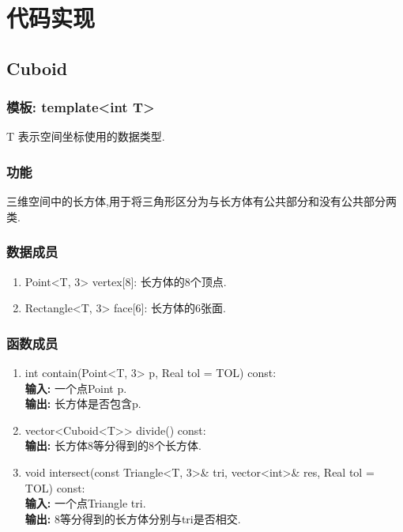 \documentclass[a4paper]{book}
\numberwithin{equation}{chapter}
\theoremstyle{definition}
\begin{document}
\section{代码实现}
\subsection{Cuboid}
\subsubsection{模板: template<int T>}
T 表示空间坐标使用的数据类型.

\subsubsection{功能}
三维空间中的长方体,用于将三角形区分为与长方体有公共部分和没有公共部分两类.

\subsubsection{数据成员}
\begin{enumerate}
  \item Point<T, 3> vertex[8]: 长方体的8个顶点.
  \item Rectangle<T, 3> face[6]: 长方体的6张面.
\end{enumerate}

\subsubsection{函数成员}
\begin{enumerate}
  \item int contain(Point<T, 3> p, Real tol = TOL) const: \\
        \textbf{输入: }一个点Point p. \\
        \textbf{输出: }长方体是否包含p.

  \item vector<Cuboid<T>\!> divide() const: \\
        \textbf{输出: }长方体8等分得到的8个长方体.

  \item void intersect(const Triangle<T, 3>\& tri,
        vector<int>\& res,
        Real tol = TOL) const: \\
        \textbf{输入: }一个点Triangle tri. \\
        \textbf{输出: }8等分得到的长方体分别与tri是否相交.
\end{enumerate}
\end{document}

